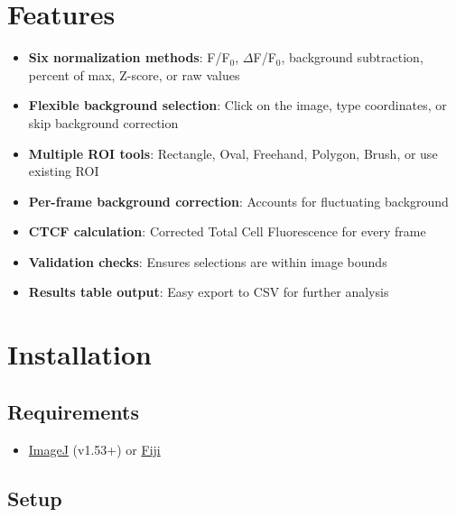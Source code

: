 \documentclass[11pt,a4paper]{article}
\begin{document}
\section{Features}

\begin{itemize}[leftmargin=*]
    \item \textbf{Six normalization methods}: F/F$_0$, $\Delta$F/F$_0$, background subtraction, percent of max, Z-score, or raw values
    \item \textbf{Flexible background selection}: Click on the image, type coordinates, or skip background correction
    \item \textbf{Multiple ROI tools}: Rectangle, Oval, Freehand, Polygon, Brush, or use existing ROI
    \item \textbf{Per-frame background correction}: Accounts for fluctuating background
    \item \textbf{CTCF calculation}: Corrected Total Cell Fluorescence for every frame
    \item \textbf{Validation checks}: Ensures selections are within image bounds
    \item \textbf{Results table output}: Easy export to CSV for further analysis
\end{itemize}

\section{Installation}

\subsection{Requirements}

\begin{itemize}
    \item \href{https://imagej.nih.gov/ij/}{ImageJ} (v1.53+) or \href{https://fiji.sc/}{Fiji}
\end{itemize}

\subsection{Setup}
\end{document}
